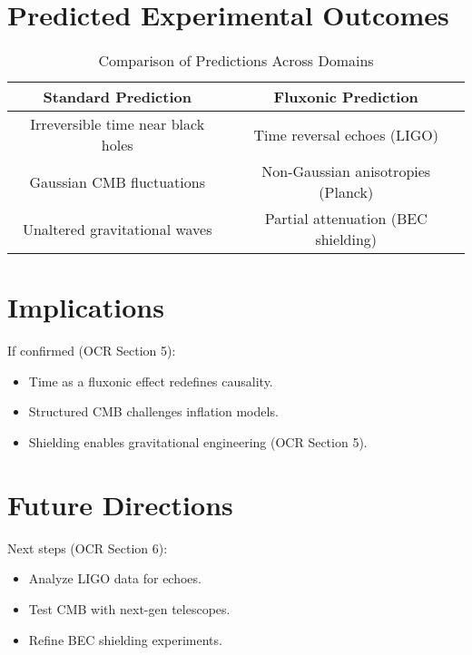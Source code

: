 \documentclass{article}
\begin{document}
\section{Predicted Experimental Outcomes}
\begin{table}[h]
    \centering
    \begin{tabular}{|c|c|}
        \hline
        \textbf{Standard Prediction} & \textbf{Fluxonic Prediction} \\
        \hline
        Irreversible time near black holes & Time reversal echoes (LIGO) \\
        Gaussian CMB fluctuations & Non-Gaussian anisotropies (Planck) \\
        Unaltered gravitational waves & Partial attenuation (BEC shielding) \\
        \hline
    \end{tabular}
    \caption{Comparison of Predictions Across Domains}
    \label{tab:predictions}
\end{table}

\section{Implications}
If confirmed (OCR Section 5):
\begin{itemize}
    \item Time as a fluxonic effect redefines causality.
    \item Structured CMB challenges inflation models.
    \item Shielding enables gravitational engineering (OCR Section 5).
\end{itemize}

\section{Future Directions}
Next steps (OCR Section 6):
\begin{itemize}
    \item Analyze LIGO data for echoes.
    \item Test CMB with next-gen telescopes.
    \item Refine BEC shielding experiments.
\end{itemize}
\end{document}
